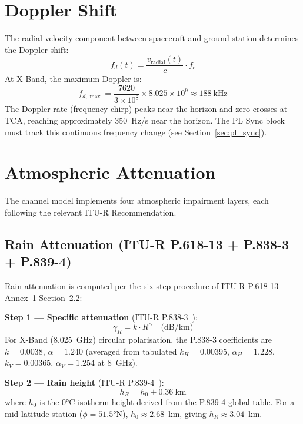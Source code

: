 \documentclass[12pt,a4paper]{report}
\begin{document}
\section{Doppler Shift}

The radial velocity component between spacecraft and ground station determines
the Doppler shift:
\begin{equation}
    f_d(t) = \frac{v_\text{radial}(t)}{c} \cdot f_c
\end{equation}
At X-Band, the maximum Doppler is:
\begin{equation}
    f_{d,\max} = \frac{7620}{3\times10^8} \times 8.025\times10^9 \approx 188~\text{kHz}
\end{equation}
The Doppler rate (frequency chirp) peaks near the horizon and zero-crosses at
TCA, reaching approximately 350~Hz/s near the horizon. The PL Sync block must
track this continuous frequency change (see Section~\ref{sec:pl_sync}).

\section{Atmospheric Attenuation}
\label{sec:atm_atten}

The channel model implements four atmospheric impairment layers, each following
the relevant ITU-R Recommendation.

\subsection{Rain Attenuation (ITU-R P.618-13 + P.838-3 + P.839-4)}

Rain attenuation is computed per the six-step procedure of
ITU-R P.618-13~\cite{itu_p618} Annex~1 Section~2.2:

\textbf{Step 1 — Specific attenuation} (ITU-R P.838-3~\cite{itu_p838}):
\begin{equation}
    \gamma_R = k \cdot R^\alpha \quad \text{(dB/km)}
\end{equation}
For X-Band (8.025~GHz) circular polarisation, the P.838-3 coefficients are
$k = 0.0038$, $\alpha = 1.240$ (averaged from tabulated $k_H = 0.00395$,
$\alpha_H = 1.228$, $k_V = 0.00365$, $\alpha_V = 1.254$ at 8~GHz).

\textbf{Step 2 — Rain height} (ITU-R P.839-4~\cite{itu_p839}):
\begin{equation}
    h_R = h_0 + 0.36~\text{km}
\end{equation}
where $h_0$ is the 0°C isotherm height derived from the P.839-4 global table.
For a mid-latitude station ($\phi = 51.5°$N), $h_0 \approx 2.68$~km, giving
$h_R \approx 3.04$~km.
\end{document}
